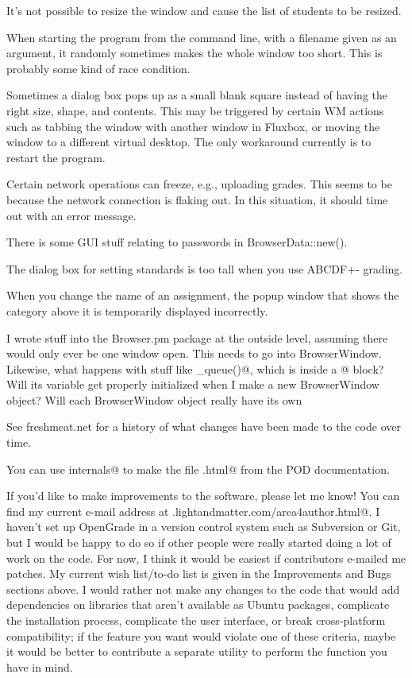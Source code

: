 \documentclass{opengrade_doc}
\begin{document}
It's not possible to resize the window and cause the list of students to be
resized.

When starting the program from the command line, with a filename given as
an argument, it randomly sometimes makes the whole window too short. This
is probably some kind of race condition.

Sometimes a dialog box pops up as a small blank square instead of having
the right size, shape, and contents. This may be triggered by certain
WM actions such as tabbing the window with another window in Fluxbox,
or moving the window to a different virtual desktop. The only workaround
currently is to restart the program.

Certain network operations can freeze, e.g., uploading grades. This seems
to be because the network connection is flaking out. In this situation,
it should time out with an error message.

There is some GUI stuff relating to passwords in BrowserData::new().

The dialog box for setting standards is too tall when you use
ABCDF+- grading.

When you change the name of an assignment, the popup window that shows
the category above it is temporarily displayed incorrectly.

I wrote stuff into the Browser.pm package at the outside level, assuming
there would only ever be one window open. This needs to go into
BrowserWindow. Likewise, what happens with stuff like \verb@grades_queue()@,
 which
is inside a \verb@BEGIN{}@ block? Will its variable get properly initialized when I
make a new BrowserWindow object? Will each BrowserWindow object really have its
own \verb@%queue@?

\label{programming}
See freshmeat.net for a history of what changes have been made to the
code over time.

You can use \verb@make internals@ to make the file \verb@internals.html@ from the
POD documentation.

If you'd like to make improvements to the software, please let me know!
You can find my current e-mail address at
\verb@www.lightandmatter.com/area4author.html@.
I haven't set up OpenGrade in a version control system such as Subversion or Git, but I would be happy to do so if
other people were really started doing a lot of work on the code.
For now, I think it would be easiest if contributors e-mailed me
patches. My current wish list/to-do list is given in the
Improvements and Bugs sections above. I would rather not make
any changes to the code that would add dependencies on
libraries that aren't available as Ubuntu packages, complicate the installation process, complicate the
user interface, or break cross-platform compatibility; if the feature
you want would violate one of these criteria, maybe it would be
better to contribute a separate utility to perform the function you
have in mind.
\end{document}
